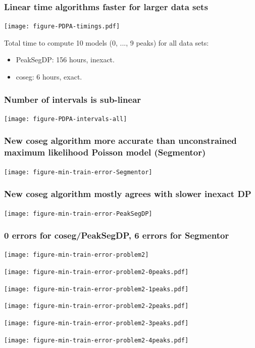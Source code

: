 \documentclass{beamer}
\begin{document}
\begin{frame}
  \frametitle{Linear time algorithms faster for larger data sets}
  \texttt{[image: figure-PDPA-timings.pdf]}

  Total time to compute 10 models (0, ..., 9 peaks) for all data sets:
  \begin{itemize}
  \item PeakSegDP: 156 hours, inexact.
  \item coseg: 6 hours, exact.
  \end{itemize}
\end{frame}

\begin{frame}
  \frametitle{Number of intervals is sub-linear}
  \texttt{[image: figure-PDPA-intervals-all]}
\end{frame}

\begin{frame}
  \frametitle{New coseg algorithm more accurate than unconstrained
    maximum likelihood Poisson model (Segmentor)}
  \texttt{[image: figure-min-train-error-Segmentor]}
\end{frame}

\begin{frame}
  \frametitle{New coseg algorithm mostly agrees with slower inexact DP}
  \texttt{[image: figure-min-train-error-PeakSegDP]}
\end{frame}

\begin{frame}
  \frametitle{0 errors for coseg/PeakSegDP, 6 errors for Segmentor}
  \texttt{[image: figure-min-train-error-problem2]}
\end{frame}

\begin{frame}
  \texttt{[image: figure-min-train-error-problem2-0peaks.pdf]}
\end{frame}

\begin{frame}
  \texttt{[image: figure-min-train-error-problem2-1peaks.pdf]}
\end{frame}

\begin{frame}
  \texttt{[image: figure-min-train-error-problem2-2peaks.pdf]}
\end{frame}

\begin{frame}
  \texttt{[image: figure-min-train-error-problem2-3peaks.pdf]}
\end{frame}

\begin{frame}
  \texttt{[image: figure-min-train-error-problem2-4peaks.pdf]}
\end{frame}
\end{document}
